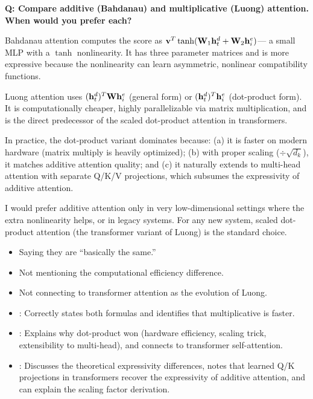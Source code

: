 \begin{interviewq}
\textbf{Q: Compare additive (Bahdanau) and multiplicative (Luong)
attention. When would you prefer each?}

 \quad {} \quad
\badgefreq{\freqmed}

\stronganswer
Bahdanau attention computes the score as
$\mathbf{v}^T \tanh(\mathbf{W}_1 \mathbf{h}_t^d + \mathbf{W}_2 \mathbf{h}_i^e)$---
a small MLP with a $\tanh$ nonlinearity.  It has three parameter matrices
and is more expressive because the nonlinearity can learn asymmetric,
nonlinear compatibility functions.

Luong attention uses
$(\mathbf{h}_t^d)^T \mathbf{W} \mathbf{h}_i^e$ (general form) or
$(\mathbf{h}_t^d)^T \mathbf{h}_i^e$ (dot-product form).
It is computationally cheaper, highly parallelizable via matrix
multiplication, and is the direct predecessor of the scaled dot-product
attention in transformers.

In practice, the dot-product variant dominates because: (a) it is faster
on modern hardware (matrix multiply is heavily optimized); (b) with
proper scaling ($\div\sqrt{d_k}$), it matches additive attention quality;
and (c) it naturally extends to multi-head attention with separate Q/K/V
projections, which subsumes the expressivity of additive attention.

I would prefer additive attention only in very low-dimensional settings
where the extra nonlinearity helps, or in legacy systems.  For any new
system, scaled dot-product attention (the transformer variant of Luong)
is the standard choice.

\redflags
\begin{itemize}
\item Saying they are ``basically the same.''
\item Not mentioning the computational efficiency difference.
\item Not connecting to transformer attention as the evolution of Luong.
\end{itemize}


\goodgreat
\begin{itemize}
\item {}: Correctly states both formulas and identifies
  that multiplicative is faster.
\item {}: Explains why dot-product won (hardware efficiency,
  scaling trick, extensibility to multi-head), and connects to
  transformer self-attention.
\item {}: Discusses the theoretical expressivity
  differences, notes that learned Q/K projections in transformers
  recover the expressivity of additive attention, and can explain the
  scaling factor derivation.
\end{itemize}

\end{interviewq}

